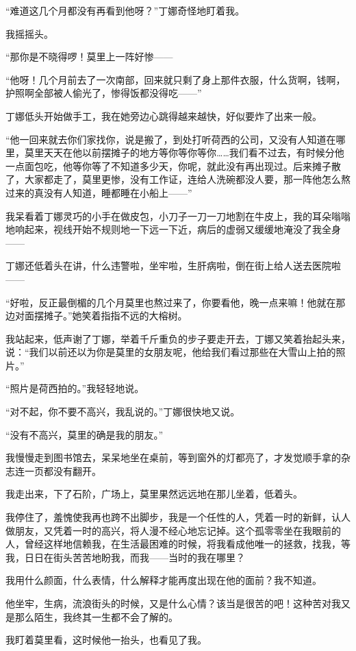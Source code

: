 \par “难道这几个月都没有再看到他呀？”丁娜奇怪地盯着我。
\par 我摇摇头。
\par “那你是不晓得啰！莫里上一阵好惨——
\par “他呀！几个月前去了一次南部，回来就只剩了身上那件衣服，什么货啊，钱啊，护照啊全部被人偷光了，惨得饭都没得吃——”
\par 丁娜低头开始做手工，我在她旁边心跳得越来越快，好似要炸了出来一般。
\par “他一回来就去你们家找你，说是搬了，到处打听荷西的公司，又没有人知道在哪里，莫里天天在他以前摆摊子的地方等你等你等你……我们看不过去，有时候分他一点面包吃，他等你等了不知道多少天，你呢，就此没有再出现过。后来摊子散了，大家都走了，莫里更惨，没有工作证，连给人洗碗都没人要，那一阵他怎么熬过来的真没有人知道，睡都睡在小船上——”
\par 我呆看着丁娜灵巧的小手在做皮包，小刀子一刀一刀地割在牛皮上，我的耳朵嗡嗡地响起来，视线开始不规则地一下远一下近，病后的虚弱又缓缓地淹没了我全身——
\par 丁娜还低着头在讲，什么违警啦，坐牢啦，生肝病啦，倒在街上给人送去医院啦——
\par “好啦，反正最倒楣的几个月莫里也熬过来了，你要看他，晚一点来嘛！他就在那边对面摆摊子。”她笑着指指不远的大榕树。
\par 我站起来，低声谢了丁娜，举着千斤重负的步子要走开去，丁娜又笑着抬起头来，说：“我们以前还以为你是莫里的女朋友呢，他给我们看过那些在大雪山上拍的照片。”
\par “照片是荷西拍的。”我轻轻地说。
\par “对不起，你不要不高兴，我乱说的。”丁娜很快地又说。
\par “没有不高兴，莫里的确是我的朋友。”
\par 我慢慢走到图书馆去，呆呆地坐在桌前，等到窗外的灯都亮了，才发觉顺手拿的杂志连一页都没有翻开。
\par 我走出来，下了石阶，广场上，莫里果然远远地在那儿坐着，低着头。
\par 我停住了，羞愧使我再也跨不出脚步，我是一个任性的人，凭着一时的新鲜，认人做朋友，又凭着一时的高兴，将人漫不经心地忘记掉。这个孤零零坐在我眼前的人，曾经这样地信赖我，在生活最困难的时候，将我看成他唯一的拯救，找我，等我，日日在街头苦苦地盼我，而我——当时的我在哪里？
\par 我用什么颜面，什么表情，什么解释才能再度出现在他的面前？我不知道。
\par 他坐牢，生病，流浪街头的时候，又是什么心情？该当是很苦的吧！这种苦对我又是那么陌生，我终其一生都不会了解的。
\par 我盯着莫里看，这时候他一抬头，也看见了我。
